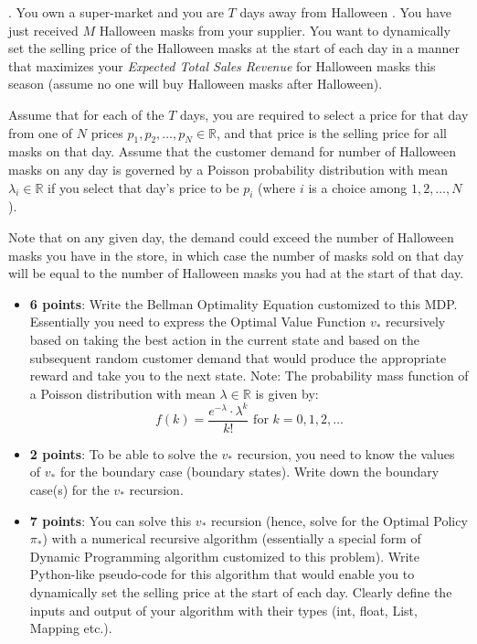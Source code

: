 \documentclass[12pt]{exam}
\begin{document}
\begin{questions}
. You own a super-market and you are $T$ days away from Halloween \smiley . You have just received $M$ Halloween masks from your supplier. You want to dynamically set the selling price of the Halloween masks at the start of each day in a manner that maximizes your {\em Expected Total Sales Revenue} for Halloween masks this season (assume no one will buy Halloween masks after Halloween). 

Assume that for each of the $T$ days, you are required to select a price for that day from one of $N$ prices $p_1, p_2, \ldots, p_N \in \mathbb{R}$, and that price is the selling price for all masks on that day. Assume that the customer demand for number of Halloween masks on any day is governed by a Poisson probability distribution with mean $\lambda_i \in \mathbb{R}$ if you select that day's price to be $p_i$ (where $i$ is a choice among $1, 2, \ldots, N$). 

Note that on any given day, the demand could exceed the number of Halloween masks you have in the store, in which case the number of masks sold on that day will be equal to the number of Halloween masks you had at the start of that day.

 \begin{itemize}
\item {\bf 6 points}: Write the Bellman Optimality Equation customized to this MDP. Essentially you need to express the Optimal Value Function $v_*$ recursively based on taking the best action in the current state and based on the subsequent random customer demand that would produce the appropriate reward and take you to the next state. Note: The probability mass function of a Poisson distribution with mean $\lambda \in \mathbb{R}$ is given by:
 $$f(k) = \frac {e^{-\lambda} \cdot \lambda^k} {k!} \mbox{ for } k = 0, 1, 2, \ldots$$
 \item {\bf 2 points}: To be able to solve the $v_*$ recursion, you need to know the values of $v_*$ for the boundary case (boundary states). Write down the boundary case(s) for the $v_*$ recursion.
\item {\bf 7 points}: You can solve this $v_*$ recursion (hence, solve for the Optimal Policy $\pi_*$) with a numerical recursive algorithm (essentially a special form of Dynamic Programming algorithm customized to this problem). Write Python-like pseudo-code for this algorithm that would enable you to dynamically set the selling price at the start of each day. Clearly define the inputs and output of your algorithm with their types (int, float, List, Mapping etc.).
\end{itemize} 
 

\end{questions}
\end{document}
